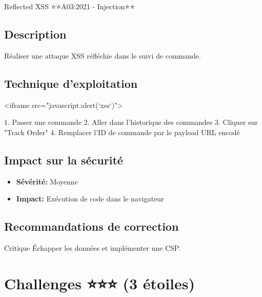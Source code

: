\begin{vulnerability}{Reflected XSS ⭐⭐}{A03:2021 - Injection}{⭐⭐}
    \subsection*{Description}
    Réaliser une attaque XSS réfléchie dans le suivi de commande.
    
    \subsection*{Technique d'exploitation}
    \begin{payload}
<iframe src="javascript:alert(`xss`)">
    \end{payload}
    1. Passer une commande
    2. Aller dans l'historique des commandes
    3. Cliquer sur "Track Order"
    4. Remplacer l'ID de commande par le payload URL encodé
    
    \subsection*{Impact sur la sécurité}
    \begin{itemize}
        \item \textbf{Sévérité:} Moyenne
        \item \textbf{Impact:} Exécution de code dans le navigateur
    \end{itemize}
    
    \subsection*{Recommandations de correction}
    \begin{recommendation}{Critique}
        Échapper les données et implémenter une CSP.
    \end{recommendation}
\end{vulnerability}

\section{Challenges ⭐⭐⭐ (3 étoiles)}

